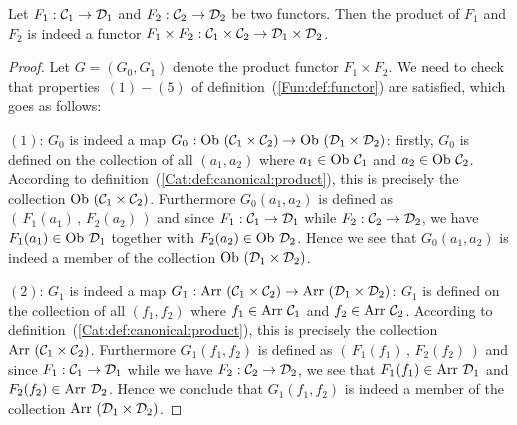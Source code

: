 \begin{prop}
    Let $F_{1}:\mbox{${\cal C}_{1}$}\to\mbox{${\cal D}_{1}$}$ and $F_{2}:\mbox{${\cal C}_{2}$}\to\mbox{${\cal D}_{2}$}$ be two functors. Then 
    the product of $F_{1}$ and $F_{2}$ is indeed a functor $F_{1}\times F_{2}: 
    \mbox{${\cal C}_{1}$}\times\mbox{${\cal C}_{2}$}\to\mbox{${\cal D}_{1}$}\times\mbox{${\cal D}_{2}$}$.
\end{prop}
\begin{proof}
    Let $G=(G_{0},G_{1})$ denote the product functor $F_{1}\times F_{2}$.
    We need to check that properties~$(1)-(5)$ of 
    definition~(\ref{Fun:def:functor}) are satisfied, which goes as follows:

    $(1)$: $G_{0}$ is indeed a map $G_{0}:\ob\ (\Cone\times\Ctwo)\to\ob\ (\Done
    \times\Dtwo)$: firstly, $G_{0}$ is defined on the 
    collection of all $(a_{1},a_{2})$ where $a_{1}\in\mbox{\rm Ob}\ \mbox{${\cal C}_{1}$}$
    and $a_{2}\in\mbox{\rm Ob}\ \mbox{${\cal C}_{2}$}$. According to 
    definition~(\ref{Cat:def:canonical:product}), this is precisely 
    the collection $\ob\ (\Cone\times\Ctwo)$. Furthermore $G_{0}(a_{1},a_{2})$
    is defined as $(\,F_{1}(a_{1})\,,\,F_{2}(a_{2})\,)$ and since 
    $F_{1}:\mbox{${\cal C}_{1}$}\to\mbox{${\cal D}_{1}$}$ while $F_{2}:\mbox{${\cal C}_{2}$}\to\mbox{${\cal D}_{2}$}$, we have $F_{1}(a_{1})
    \in\mbox{\rm Ob}\ \mbox{${\cal D}_{1}$}$ together with $F_{2}(a_{2})\in\mbox{\rm Ob}\ \mbox{${\cal D}_{2}$}$. Hence we see that
    $G_{0}(a_{1},a_{2})$ is indeed a member of the collection 
    $\ob\ (\Done\times\Dtwo)$.

    $(2)$: $G_{1}$ is indeed a map $G_{1}:\arr\ (\Cone\times\Ctwo)\to\arr\ (\Done
    \times\Dtwo)$: $G_{1}$ is defined on the 
    collection of all $(f_{1},f_{2})$ where $f_{1}\in\mbox{\rm Arr}\ \mbox{${\cal C}_{1}$}$
    and $f_{2}\in\mbox{\rm Arr}\ \mbox{${\cal C}_{2}$}$. According to 
    definition~(\ref{Cat:def:canonical:product}), this is precisely 
    the collection $\arr\ (\Cone\times\Ctwo)$. Furthermore $G_{1}(f_{1},f_{2})$
    is defined as $(\,F_{1}(f_{1})\,,\,F_{2}(f_{2})\,)$ and since 
    $F_{1}:\mbox{${\cal C}_{1}$}\to\mbox{${\cal D}_{1}$}$ while we have $F_{2}:\mbox{${\cal C}_{2}$}\to\mbox{${\cal D}_{2}$}$, we see that
    $F_{1}(f_{1})\in\mbox{\rm Arr}\ \mbox{${\cal D}_{1}$}$ and $F_{2}(f_{2})\in\mbox{\rm Arr}\ \mbox{${\cal D}_{2}$}$. Hence we 
    conclude that $G_{1}(f_{1},f_{2})$ is indeed a member of the collection 
    $\arr\ (\Done\times\Dtwo)$.


\end{proof}
